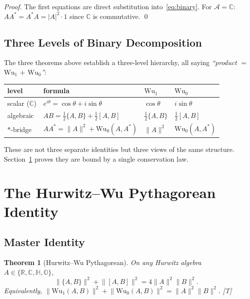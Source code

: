 \documentclass[11pt, a4paper]{article}
\newtheorem{theorem}{Theorem}
\newcommand{\R}{\mathbb{R}}
\newcommand{\C}{\mathbb{C}}
\newcommand{\Hq}{\mathbb{H}}
\newcommand{\Oct}{\mathbb{O}}
\newcommand{\Wuz}{\mathrm{Wu}_0}
\newcommand{\Wuo}{\mathrm{Wu}_1}
\newcommand{\norm}[1]{\lVert #1 \rVert}
\begin{document}
\begin{proof}
The first equations are direct substitution into~\eqref{eq:binary}.
For $\mathcal{A} = \C$: $AA^* = A^*A = |A|^2 \cdot 1$ since $\C$ is
commutative. \qed
\end{proof}

\subsection{Three Levels of Binary Decomposition}

The three theorems above establish a three-level hierarchy, all
saying \emph{``product $=$ $\Wuo$ $+$ $\Wuz$''}:
\begin{center}
\begin{tabular}{@{}llll@{}}
\toprule
level & formula & $\Wuo$ & $\Wuz$ \\
\midrule
scalar ($\C$) & $e^{i\theta} = \cos\theta + i\sin\theta$ &
$\cos\theta$ & $i\sin\theta$ \\
algebraic & $AB = \tfrac12\{A,B\} + \tfrac12[A,B]$ &
$\tfrac{1}{2}\{A,B\}$ & $\tfrac{1}{2}[A,B]$ \\
$*$-bridge & $AA^* = \norm{A}^2 + \Wuz(A,A^*)$ &
$\norm{A}^2$ & $\Wuz(A,A^*)$ \\
\bottomrule
\end{tabular}
\end{center}
These are not three separate identities but three views of the same
structure. Section~\ref{sec:pythagorean} proves they are bound by a
single conservation law.


\section{The Hurwitz--Wu Pythagorean Identity}
\label{sec:pythagorean}

\subsection{Master Identity}

\begin{theorem}[Hurwitz--Wu Pythagorean]
\label{thm:pythagorean}
On any Hurwitz algebra $A \in \{\R, \C, \Hq, \Oct\}$,
\begin{equation}
\boxed{\;\norm{\{A, B\}}^2 + \norm{[A, B]}^2 = 4\norm{A}^2 \norm{B}^2.\;}
\label{eq:pythagorean}
\end{equation}
Equivalently, $\norm{\Wuo(A,B)}^2 + \norm{\Wuz(A,B)}^2
= \norm{A}^2\norm{B}^2$. [T]
\end{theorem}
\end{document}
